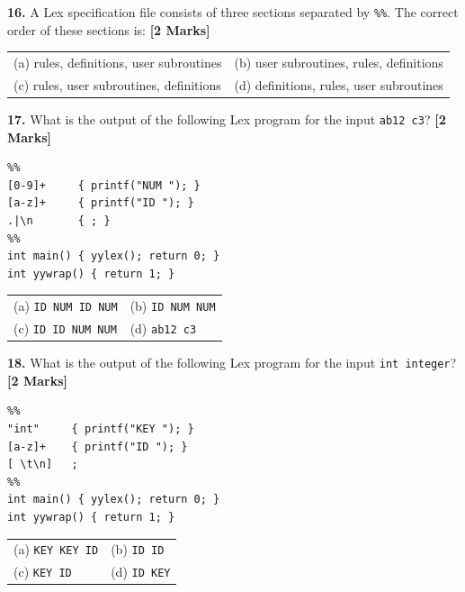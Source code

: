\documentclass[11pt,a4paper]{article}
\begin{document}

\noindent \textbf{16.} A Lex specification file consists of three sections separated by \texttt{\%\%}. The correct order of these sections is: \hfill \textbf{[2 Marks]}
\vspace{0.06cm}
\noindent
\begin{tabularx}{\textwidth}{@{}X X@{}}
(a) rules, definitions, user subroutines & (b) user subroutines, rules, definitions \\[3pt]
(c) rules, user subroutines, definitions & (d) definitions, rules, user subroutines \\
\end{tabularx}

\vspace{0.22cm}

\noindent \textbf{17.} What is the output of the following Lex program for the input \texttt{ab12 c3}? \hfill \textbf{[2 Marks]}
\begin{lstlisting}
%%
[0-9]+     { printf("NUM "); }
[a-z]+     { printf("ID "); }
.|\n       { ; }
%%
int main() { yylex(); return 0; }
int yywrap() { return 1; }
\end{lstlisting}
\vspace{0.06cm}
\noindent
\begin{tabularx}{\textwidth}{@{}X X@{}}
(a) \texttt{ID NUM ID NUM} & (b) \texttt{ID NUM NUM} \\[3pt]
(c) \texttt{ID ID NUM NUM} & (d) \texttt{ab12 c3} \\
\end{tabularx}

\vspace{0.22cm}

\noindent \textbf{18.} What is the output of the following Lex program for the input \texttt{int integer}? \hfill \textbf{[2 Marks]}
\begin{lstlisting}
%%
"int"     { printf("KEY "); }
[a-z]+    { printf("ID "); }
[ \t\n]   ;
%%
int main() { yylex(); return 0; }
int yywrap() { return 1; }
\end{lstlisting}
\vspace{0.06cm}
\noindent
\begin{tabularx}{\textwidth}{@{}X X@{}}
(a) \texttt{KEY KEY ID} & (b) \texttt{ID ID} \\[3pt]
(c) \texttt{KEY ID} & (d) \texttt{ID KEY} \\
\end{tabularx}
\end{document}
